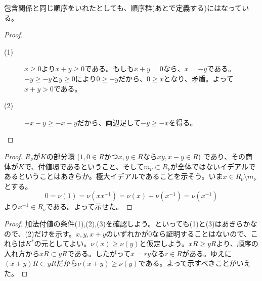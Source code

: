 \begin{rem}
  包含関係と同じ順序をいれたとしても、順序群(あとで定義する)にはなっている。
\end{rem}


\begin{proof} ${}$
  \begin{description}
    \item[(1)] $x \geq 0$より$x + y \geq 0$である。もしも$x+y=0$なら、$x=-y$である。$-y \geq -y$と$y \geq 0$により$0 \geq -y$だから、$0 \geq x$となり、矛盾。よって$x+y>0$である。
    \item[(2)] $-x-y \geq -x-y$だから、両辺足して$-y \geq -x$を得る。
  \end{description}
\end{proof}


\begin{proof}
  $R_{\nu}$が$K$の部分環 ($1,0 \in R$かつ$x,y \in R$なら$xy,x-y \in R$) であり、その商体が$K$で、付値環であるということ、そして$m_{\nu} \subset R_{\nu}$が全体ではないイデアルであるということはあきらか。極大イデアルであることを示そう。いま$x \in R_{\nu} \setminus m_{\nu}$とする。
  \[
  0 =\nu(1) = \nu (x x^{-1}) = \nu(x) + \nu(x^{-1}) = \nu(x^{-1})
  \]
  より$x^{-1} \in R_{\nu}$である。よって示せた。
\end{proof}



\begin{proof}
  加法付値の条件(1),(2),(3)を確認しよう。といっても(1)と(3)はあきらかなので、(2)だけを示す。$x,y,x+y$のいずれかが$0$なら証明することはないので、これらは$K^*$の元としてよい。$\nu(x) \geq \nu(y)$と仮定しよう。$xR \geq yR$より、順序の入れ方から$xR \subset yR$である。したがって$x = ry$なる$r \in R$がある。ゆえに$(x+y)R \subset yR$だから$\nu(x+y) \geq \nu(y)$である。よって示すべきことがいえた。
\end{proof}



